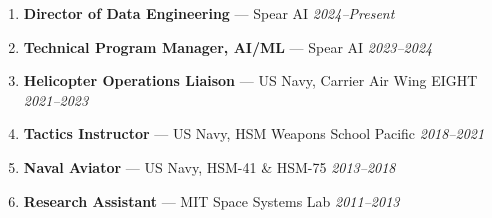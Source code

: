 \newcommand{\jobminimal}[3]{%
  \item \textcolor{secondary}{\textbf{#1}} --- #2 \hfill \emph{#3}%
}
\begin{enumerate}
    \jobminimal{Director of Data Engineering}{Spear AI}{2024--Present}
    \jobminimal{Technical Program Manager, AI/ML}{Spear AI}{2023--2024}
    \jobminimal{Helicopter Operations Liaison}{US Navy, Carrier Air Wing EIGHT}{2021--2023}
    \jobminimal{Tactics Instructor}{US Navy, HSM Weapons School Pacific}{2018--2021}
    \jobminimal{Naval Aviator}{US Navy, HSM-41 \& HSM-75}{2013--2018}
    \jobminimal{Research Assistant}{MIT Space Systems Lab}{2011--2013}
\end{enumerate}
